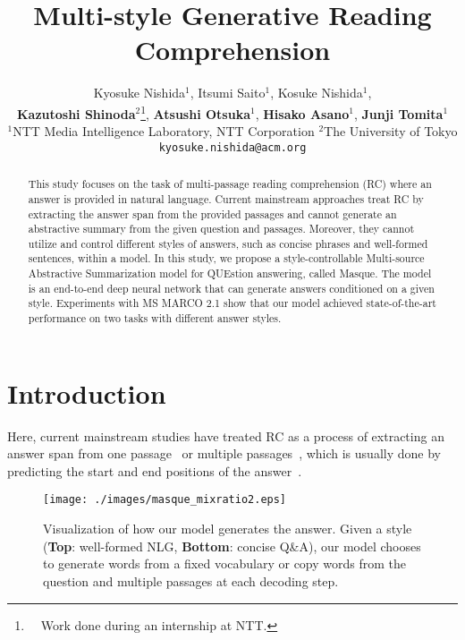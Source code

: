 \documentclass[11pt,a4paper]{article}
\theoremstyle{mydef}
\theoremstyle{myprob}
\begin{document}
\title{Multi-style Generative Reading Comprehension}

\author{Kyosuke Nishida$^1$, 
Itsumi Saito$^1$, 
Kosuke Nishida$^1$, 
\\{\bf Kazutoshi Shinoda}$^2$\thanks{\ \ Work done during an internship at NTT.}, 
{\bf Atsushi Otsuka}$^1$,
{\bf Hisako Asano}$^1$, 
{\bf Junji Tomita}$^1$\\
  $^1$NTT Media Intelligence Laboratory, NTT Corporation \hspace{1.5em}  $^2$The University of Tokyo\\
  {\tt kyosuke.nishida@acm.org}
}

\date{}

\maketitle
\begin{abstract}
This study focuses on the task of multi-passage reading comprehension (RC) where an answer is provided in natural language. Current mainstream approaches treat RC by extracting the answer span from the provided passages and cannot generate an abstractive summary from the given question and passages. Moreover, they cannot utilize and control different styles of answers, such as concise phrases and well-formed sentences, within a model. 
In this study, we propose a style-controllable Multi-source Abstractive Summarization model for QUEstion answering, called Masque. The model is an end-to-end deep neural network that can generate answers conditioned on a given style. 
Experiments with MS MARCO 2.1 show that our model achieved state-of-the-art performance %
on two tasks with different answer styles.
\end{abstract}

\section{Introduction}
\label{sec:intro}

Here, current mainstream studies have treated RC as a process of extracting an answer span from one passage~\citep{RajpurkarZLL16,RajpurkarJL18} or multiple passages~\citep{JoshiCWZ17}, which is usually done by predicting the start and end positions of the answer~\citep{Yu18,DevlinCLT18}.

\begin{figure}[t!]
\centering
\texttt{[image: ./images/masque\_mixratio2.eps]}
\caption{Visualization of how our model generates the answer. Given a style (\textbf{Top}: well-formed NLG, \textbf{Bottom}: concise Q\&A), our model chooses to generate words from a fixed vocabulary or copy words from the question and multiple passages at each decoding step.
}
\label{fig:mixratio}
\end{figure}
 
\end{document}
